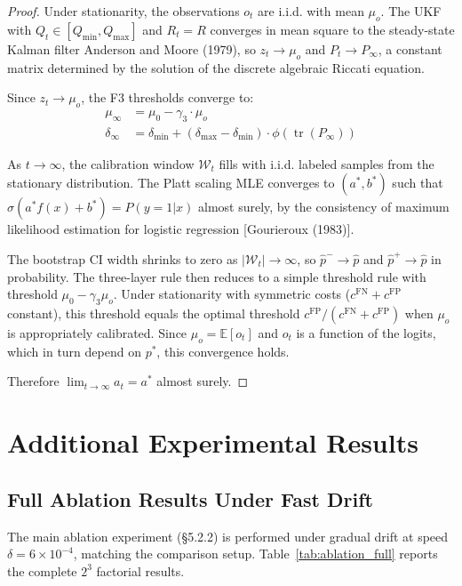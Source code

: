\documentclass[12pt,a4paper]{article}
\newcommand{\tr}{\operatorname{tr}}
\begin{document}
\begin{proof}
Under stationarity, the observations $o_t$ are i.i.d. with mean $\mu_o$. The UKF with $Q_t \in [Q_{\min}, Q_{\max}]$ and $R_t = R$ converges in mean square to the steady-state Kalman filter Anderson and Moore (1979), so $z_t \to \mu_o$ and $P_t \to P_\infty$, a constant matrix determined by the solution of the discrete algebraic Riccati equation.

Since $z_t \to \mu_o$, the F3 thresholds converge to:
\begin{align}
\mu_\infty &= \mu_0 - \gamma_3 \cdot \mu_o \\
\delta_\infty &= \delta_{\min} + (\delta_{\max} - \delta_{\min}) \cdot \phi(\tr(P_\infty))
\end{align}

As $t \to \infty$, the calibration window $\mathcal{W}_t$ fills with i.i.d. labeled samples from the stationary distribution. The Platt scaling MLE converges to $(a^*, b^*)$ such that $\sigma(a^* f(x) + b^*) = P(y=1|x)$ almost surely, by the consistency of maximum likelihood estimation for logistic regression [Gourieroux (1983)].

The bootstrap CI width shrinks to zero as $|\mathcal{W}_t| \to \infty$, so $\hat{p}^- \to \hat{p}$ and $\hat{p}^+ \to \hat{p}$ in probability. The three-layer rule then reduces to a simple threshold rule with threshold $\mu_0 - \gamma_3 \mu_o$. Under stationarity with symmetric costs ($c^{\text{FN}} + c^{\text{FP}}$ constant), this threshold equals the optimal threshold $c^{\text{FP}}/(c^{\text{FN}} + c^{\text{FP}})$ when $\mu_o$ is appropriately calibrated. Since $\mu_o = \mathbb{E}[o_t]$ and $o_t$ is a function of the logits, which in turn depend on $p^*$, this convergence holds.

Therefore $\lim_{t\to\infty} a_t = a^*$ almost surely.
\end{proof}

\section{Additional Experimental Results}

\subsection{Full Ablation Results Under Fast Drift}

The main ablation experiment (\S5.2.2) is performed under gradual drift at speed $\delta = 6 \times 10^{-4}$, matching the comparison setup. Table~\ref{tab:ablation_full} reports the complete $2^3$ factorial results.
\end{document}
